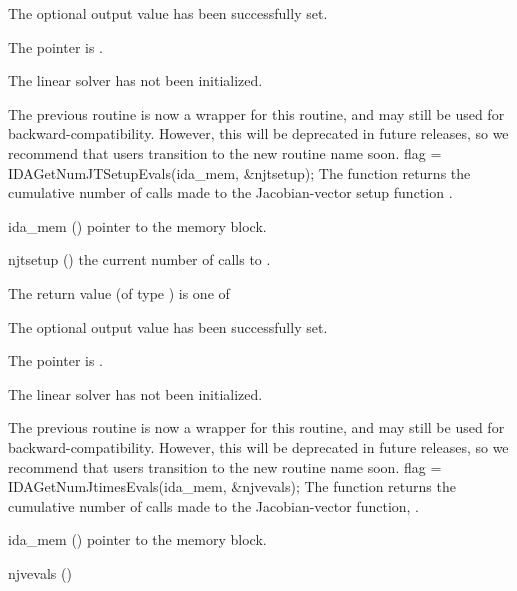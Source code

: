 {{\begin{args}
  \item[\Id{IDALS\_SUCCESS}]
    The optional output value has been successfully set.
  \item[\Id{IDALS\_MEM\_NULL}]
    The  pointer is .
  \item[\Id{IDALS\_LMEM\_NULL}]
    The {\idals} linear solver has not been initialized.
  \end{args}
}
{
  The previous routine  is now a wrapper for
  this routine, and may still be used for backward-compatibility.
  However, this will be deprecated in future releases, so we recommend
  that users transition to the new routine name soon.
}
{
  flag = IDAGetNumJTSetupEvals(ida\_mem, \&njtsetup);
}
{
  The function  returns the
  cumulative number of calls made to the Jacobian-vector setup
  function .
}
{
  \begin{args}
  \item[ida\_mem] ()
    pointer to the {\ida} memory block.
  \item[njtsetup] ()
    the current number of calls to .
  \end{args}
}
{
  The return value  (of type ) is one of
  \begin{args}
  \item[\Id{IDALS\_SUCCESS}]
    The optional output value has been successfully set.
  \item[\Id{IDALS\_MEM\_NULL}]
    The  pointer is .
  \item[\Id{IDALS\_LMEM\_NULL}]
    The {\idals} linear solver has not been initialized.
  \end{args}
}
{
  The previous routine  is now a wrapper for
  this routine, and may still be used for backward-compatibility.
  However, this will be deprecated in future releases, so we recommend
  that users transition to the new routine name soon.
}
{
  flag = IDAGetNumJtimesEvals(ida\_mem, \&njvevals);
}
{
  The function  returns the
  cumulative number of calls made to the Jacobian-vector function,
  .
}
{
  \begin{args}[njvevals]
  \item[ida\_mem] ()
    pointer to the {\ida} memory block.
  \item[njvevals] ()

\end{args}}}
